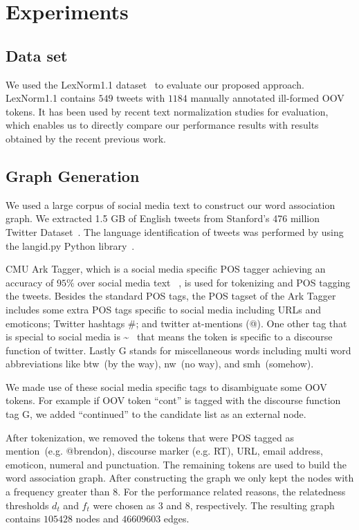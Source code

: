 \documentclass[preprint,review,12pt]{elsarticle}
\begin{document}
\section{Experiments}
\label{sec:experiments}

\subsection{Data set}
We used the LexNorm1.1 dataset~\cite{Han:2011:LNS:2002472.2002520} to evaluate our proposed approach. LexNorm1.1 contains $549$ tweets with $1184$ manually annotated ill-formed OOV tokens. It has been used by recent text normalization studies for evaluation, which enables us to directly compare our performance results with results obtained by the recent previous work.

\subsection{Graph Generation}
We used a large corpus of social media text to construct our word association graph. We extracted 1.5 GB of English tweets from Stanford's 476 million Twitter Dataset~\cite{DBLP:conf/wsdm/YangL11}. The language identification of tweets was performed by using the langid.py Python library~\cite{Lui:2012:LOL:2390470.2390475, Baldwin:2010:LIL:1857999.1858026}.

CMU Ark Tagger, which is a social media specific POS tagger achieving an accuracy of $95\%$ over social media text ~\cite{owoputi2013improved,Gimpel:2011:PTT:2002736.2002747}, is used for tokenizing and POS tagging the tweets. Besides the standard POS tags, the POS tagset of the Ark Tagger includes some extra POS tags specific to social media including URLs and emoticons; Twitter hashtags \#; and twitter at-mentions (@). One other tag that is special to social media is \textasciitilde~ that means the token is specific to a discourse function of twitter. Lastly G stands for miscellaneous words including multi word abbreviations like btw~(by the way), nw~(no way), and smh~(somehow).

We made use of these social media specific tags to disambiguate some OOV tokens. For example if OOV token ``cont'' is tagged with the discourse function tag G, we added ``continued'' to the candidate list as an external node.

After tokenization, we removed the tokens that were POS tagged as mention~(e.g. @brendon), discourse marker (e.g. RT), URL, email address, emoticon, numeral and punctuation. The remaining tokens are used to build the word association graph. After constructing the graph we only kept the nodes with a frequency greater than $8$. For the performance related reasons, the relatedness thresholds $d_t$ and $f_t$  were chosen as $3$ and $8$, respectively. The resulting graph contains $105428$ nodes and $46609603$ edges.
\end{document}
